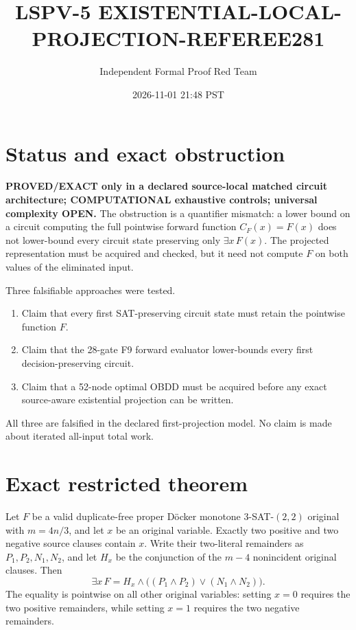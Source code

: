 \documentclass[11pt]{article}
\title{LSPV-5 EXISTENTIAL-LOCAL-PROJECTION-REFEREE281}
\author{Independent Formal Proof Red Team}
\date{2026-11-01 21:48 PST}
\begin{document}
\maketitle

\section{Status and exact obstruction}

\textbf{PROVED/EXACT only in a declared source-local matched circuit
architecture; COMPUTATIONAL exhaustive controls; universal complexity OPEN.}
The obstruction is a quantifier mismatch: a lower bound on a circuit computing
the full pointwise forward function $C_F(x)=F(x)$ does not lower-bound every
circuit state preserving only $\exists x\,F(x)$.  The projected representation
must be acquired and checked, but it need not compute $F$ on both values of the
eliminated input.

Three falsifiable approaches were tested.
\begin{enumerate}
\item Claim that every first SAT-preserving circuit state must retain the
pointwise function $F$.
\item Claim that the 28-gate F9 forward evaluator lower-bounds every first
decision-preserving circuit.
\item Claim that a 52-node optimal OBDD must be acquired before any exact
source-aware existential projection can be written.
\end{enumerate}
All three are falsified in the declared first-projection model.  No claim is
made about iterated all-input total work.

\section{Exact restricted theorem}

Let $F$ be a valid duplicate-free proper D\"ocker monotone
$3$-SAT-$(2,2)$ original with $m=4n/3$, and let $x$ be an original variable.
Exactly two positive and two negative source clauses contain $x$.  Write their
two-literal remainders as $P_1,P_2,N_1,N_2$, and let $H_x$ be the conjunction
of the $m-4$ nonincident original clauses.  Then
\[
 \exists x\,F
 =H_x\wedge\big((P_1\wedge P_2)\vee(N_1\wedge N_2)\big).
\]
The equality is pointwise on all other original variables: setting $x=0$
requires the two positive remainders, while setting $x=1$ requires the two
negative remainders.
\end{document}
